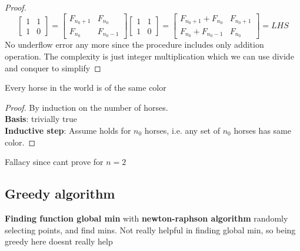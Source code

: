 \documentclass[11pt]{article}
\begin{document}
\begin{example}
\begin{solution}
\begin{enumerate}
\begin{proof}
\[\begin{bmatrix}
          1 & 1 \\
          1 & 0
        \end{bmatrix} = \begin{bmatrix}
          F_{n_0+1} & F_{n_0} \\
          F_{n_0} & F_{n_0-1}
        \end{bmatrix} \begin{bmatrix}
          1 & 1 \\
          1 & 0
        \end{bmatrix} = \begin{bmatrix}
        F_{n_0 + 1} + F_{n_0} & F_{n_0 + 1}\\
        F_{n_0} + F_{n_0 - 1} & F_{n_0}
      \end{bmatrix} = LHS
      \]
      No underflow error any more since the procedure includes only addition operation. The complexity is just integer multiplication which we can use divide and conquer to simplify
    \end{proof}
  \end{enumerate}
\end{solution}


\end{example}



\begin{example}
  Every horse in the world is of the same color
  \begin{proof}
    By induction on the number of horses.\\
    \textbf{Basis}: trivially true \\
    \textbf{Inductive step}: Assume holds for $n_0$ horses, i.e. any set of $n_0$ horses has same color.
  \end{proof}
  Fallacy since cant prove for $n=2$
\end{example}

\subsection*{Greedy algorithm}

\begin{example}
  \textbf{Finding function global min} with
  \textbf{newton-raphson algorithm}
  randomly selecting points, and find mins. Not really helpful in finding global min, so being greedy here doesnt really help
\end{example}
\end{document}
